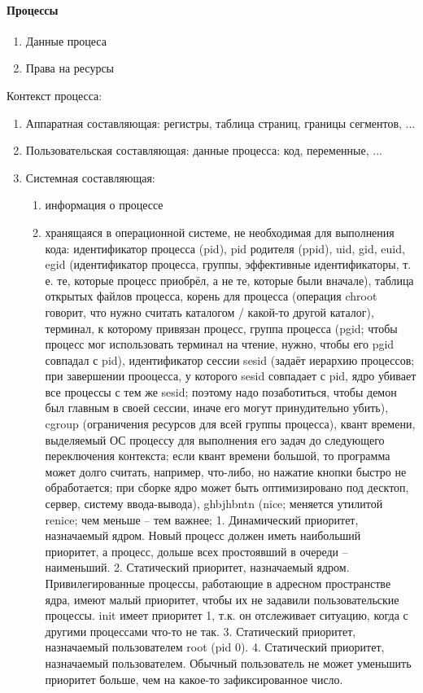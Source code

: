 \documentclass[a4paper,10pt]{article}
\begin{document}
\paragraph{Процессы}
\begin{enumerate}
\item Данные процеса
\item Права на ресурсы
\end{enumerate}
Контекст процесса:
\begin{enumerate}
\item Аппаратная составляющая: регистры, таблица страниц, границы сегментов, ...
\item Пользовательская составляющая: данные процесса: код, переменные, ... 
\item Системная составляющая: 
\begin{enumerate}
\item информация о процессе
\item хранящаяся в операционной системе, не необходимая для выполнения кода: идентификатор процесса (pid), pid родителя (ppid), uid, gid, euid, egid (идентификатор процесса, группы, эффективные идентификаторы, т. е. те, которые процесс приобрёл, а не те, которые были вначале), таблица открытых файлов процесса, корень для процесса (операция chroot говорит, что нужно считать каталогом / какой-то другой каталог), терминал, к которому привязан процесс, группа процесса (pgid; чтобы процесс мог использовать терминал на чтение, нужно, чтобы его pgid совпадал с pid), идентификатор сессии sesid (задаёт иерархию процессов; при завершении прооцесса, у которого sesid совпадает с pid, ядро убивает все процессы с тем же sesid; поэтому надо позаботиться, чтобы демон был главным в своей сессии, иначе его могут принудительно убить), cgroup (ограничения ресурсов для всей группы процесса), квант времени, выделяемый ОС процессу для выполнения его задач до следующего переключения контекста; если квант времени большой, то программа может долго считать, например, что-либо, но нажатие кнопки быстро не обработается; при сборке ядро может быть оптимизировано под десктоп, сервер, систему ввода-вывода), ghbjhbntn (nice; меняется утилитой renice; чем меньше -- тем важнее; 1. Динамический приоритет, назначаемый ядром. Новый процесс должен иметь наибольший приоритет, а процесс, дольше всех простоявший в очереди -- наименьший.
2. Статический приоритет, назначаемый ядром. Привилегированные процессы, работающие в адресном пространстве ядра, имеют малый приоритет, чтобы их не задавили пользовательские процессы.
init имеет приоритет 1, т.к. он отслеживает ситуацию, когда с другими процессами что-то не так.
3. Статический приоритет, назначаемый пользователем root (pid 0).
4. Статический приоритет, назначаемый пользователем. Обычный пользователь не может уменьшить приоритет больше, чем на какое-то зафиксированное число.


\end{enumerate}
\end{enumerate}
\end{document}
